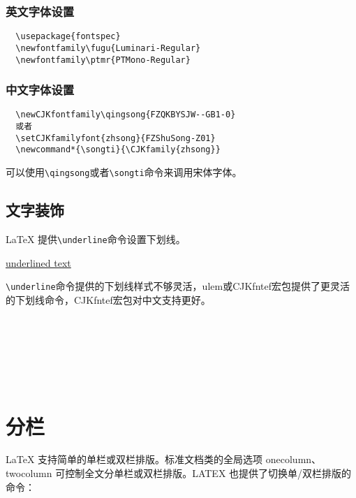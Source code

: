 \subsubsection{英文字体设置}
\begin{lstlisting}
  \usepackage{fontspec}
  \newfontfamily\fugu{Luminari-Regular}
  \newfontfamily\ptmr{PTMono-Regular}
\end{lstlisting}

\subsubsection{中文字体设置}
\begin{lstlisting}
  \newCJKfontfamily\qingsong{FZQKBYSJW--GB1-0}
  或者
  \setCJKfamilyfont{zhsong}{FZShuSong-Z01}
  \newcommand*{\songti}{\CJKfamily{zhsong}}
\end{lstlisting}

可以使用\lstinline|\qingsong|或者\lstinline{\songti}命令来调用宋体字体。

\subsection{文字装饰}\label{subsec:decor}

\LaTeX{} 提供\lstinline{\underline}命令设置下划线。

\begin{codeshow}
  \underline{underlined text}
\end{codeshow}

\lstinline{\underline}命令提供的下划线样式不够灵活，ulem或CJKfntef宏包提供了更灵活的下划线命令，CJKfntef宏包对中文支持更好。

\begin{codeshow}
  \\
  \\
  \\
  \\
  \\
\end{codeshow}

\section{分栏}\label{sec:columns}

\LaTeX{} 支持简单的单栏或双栏排版。标准文档类的全局选项 onecolumn、twocolumn 可控制全文分单栏或双栏排版。LATEX 也提供了切换单/双栏排版的命令：


